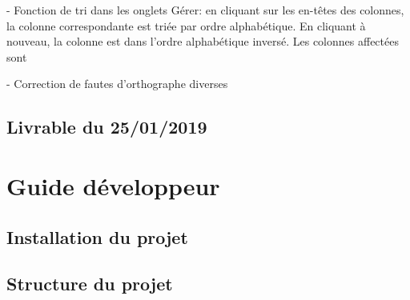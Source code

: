 \documentclass[noposter]{polytech/polytech}
\begin{document}
- Fonction de tri dans les onglets Gérer: en cliquant sur les en-têtes des colonnes, la colonne correspondante est triée par ordre alphabétique. En cliquant à nouveau, la colonne est dans l'ordre alphabétique inversé. Les colonnes affectées sont 

- Correction de fautes d'orthographe diverses

\section{Livrable du 25/01/2019}


\chapter{Guide développeur}


\section{Installation du projet}


\section{Structure du projet}
\end{document}
